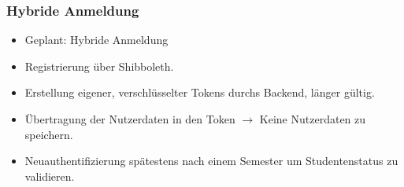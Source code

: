 \begin{frame}\frametitle{Hybride Anmeldung}
    \begin{itemize}
        \item Geplant: Hybride Anmeldung
        \item Registrierung über Shibboleth.
        \item Erstellung eigener, verschlüsselter Tokens durchs Backend, länger gültig.
        \item Übertragung der Nutzerdaten in den Token $\rightarrow$ Keine Nutzerdaten zu speichern.
        \item Neuauthentifizierung spätestens nach einem Semester um Studentenstatus zu validieren.
    \end{itemize}
\end{frame}